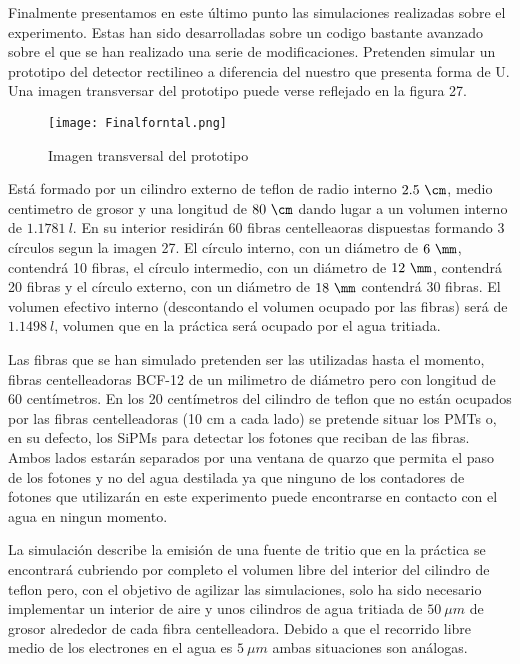 Finalmente presentamos en este último punto las simulaciones realizadas sobre el experimento. Estas han sido desarrolladas sobre un codigo bastante avanzado sobre el que se han realizado una serie de modificaciones. Pretenden simular un prototipo del detector rectilineo a diferencia del nuestro que presenta forma de U. Una imagen transversar del prototipo puede verse reflejado en la figura 27.

\begin{figure}[hbtp]
\centering
\texttt{[image: Finalforntal.png]}
\caption{Imagen transversal del prototipo\label{imagenprototiposimulado}}
\end{figure}


Está formado por un cilindro externo de teflon  de radio interno $2.5~\cm$, medio centimetro de grosor y una longitud de $80~\cm$ dando lugar a un volumen interno de $1.1781~l$. En su interior residirán 60 fibras centelleaoras dispuestas formando 3 círculos segun la imagen 27. El círculo interno, con un diámetro de $6~\mm$, contendrá 10 fibras, el círculo intermedio, con un diámetro de $12~\mm$, contendrá 20 fibras y el círculo externo, con un diámetro de $18~\mm$ contendrá 30 fibras. El volumen efectivo interno (descontando el volumen ocupado por las fibras) será de $1.1498~l$, volumen que en la práctica será ocupado por el agua tritiada.

Las fibras que se han simulado pretenden ser las utilizadas hasta el momento, fibras centelleadoras BCF-12 de un milimetro de diámetro pero con longitud de 60 centímetros. En los 20 centímetros del cilindro de teflon que no están ocupados por las fibras centelleadoras (10 cm a cada lado) se pretende situar los PMTs o, en su defecto, los SiPMs para detectar los fotones que reciban de las fibras. Ambos lados estarán separados por una ventana de quarzo que permita el paso de los fotones y no del agua destilada ya que ninguno de los contadores de fotones que utilizarán en este experimento puede encontrarse en contacto con el agua en ningun momento.

La simulación describe la emisión de una fuente de tritio que en la práctica se encontrará cubriendo por completo el volumen libre del interior del cilindro de teflon pero, con el objetivo de agilizar las simulaciones, solo ha sido necesario implementar un interior de aire y unos cilindros de agua tritiada de $50~\mu m$ de grosor alrededor de cada fibra centelleadora. Debido a que el recorrido libre medio de los electrones en el agua es $5~\mu m$ ambas situaciones son análogas. 

